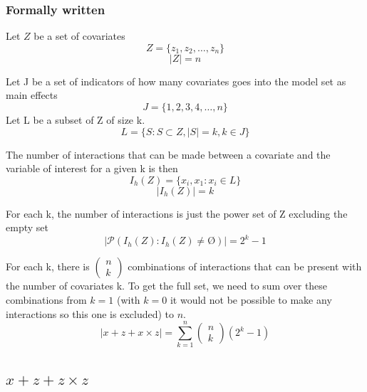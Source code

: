 \subsubsection{Formally written}
Let $Z$ be a set of covariates 
\[Z=\{\left.z_1,z_2,\dots ,z_n\right.\}\] 
\[|Z|=n\] 

Let J be a set of indicators of how many covariates goes into the model set as main effects
\[J=\{\left.1,2,3,4,\dots ,n\right.\}\] 
Let L be a subset of Z of size k.
\[L=\{\left.S:S\subset Z,\left|S\right|=k,k\in J\right.\}\] 

The number of interactions that can be made between a covariate and the variable of interest for a given k is then
\[I_h\left(Z\right)=\{\left.\left.x_i,x_1\right.:x_i\in L\right.\}\] 
\[\left|I_h\left(Z\right)\right|=k\] 

For each k, the number of interactions is just the power set of Z excluding the empty set
\[\left|\mathcal{P}\left(I_h\left(Z\right):I_h\left(Z\right)\neq \textrm{\O}\right)\right|=2^k-1\] 

For each k, there is $\left( \begin{array}{c}
n \\ 
k \end{array}
\right)$ combinations of interactions that can be present with the number of covariates k. To get the full set, we need to sum over these combinations from $k=1$ (with $k=0$ it would not be possible to make any interactions so this one is excluded) to $n$.
\[\left|x + z + x \times z\right|=\sum^n_{k=1}{\left( \begin{array}{c}
n \\ 
k \end{array}
\right)\left(2^k-1\right)}\] 
\textbf{}

\subsection{$x + z + z \times z$}

